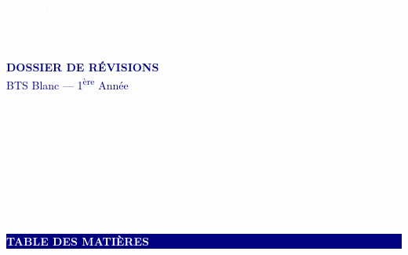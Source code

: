\documentclass[a4paper,10pt]{article}
\begin{document}
\begin{titlepage}
  \pagecolor{navy}
  \begin{center}
    \vspace*{3cm}

    {\Huge\bfseries\textcolor{white}{BTS SIO}}\\[0.5cm]
    {\LARGE\textcolor{white}{Brevet de Technicien Supérieur}}\\
    {\LARGE\textcolor{white}{Services Informatiques aux Organisations}}\\[2cm]

    \begin{tcolorbox}[colback=white, colframe=white, arc=5mm, width=0.8\textwidth]
      \centering
      {\huge\bfseries\textcolor{navy}{DOSSIER DE RÉVISIONS}}\\[0.3cm]
      {\Large\textcolor{navy}{BTS Blanc — 1\textsuperscript{ère} Année}}
    \end{tcolorbox}

    \vspace{2cm}

    {\LARGE\textcolor{white}{Maël Mignard}}\\[0.5cm]
    {\large\textcolor{white}{\today}}

    \vspace{3cm}

    \begin{tcolorbox}[colback=navy!80!black, colframe=white, arc=3mm, width=0.9\textwidth, boxrule=0.5mm]
      \centering\textcolor{white}{\textbf{Matières couvertes :}}\\[0.3cm]
      \textcolor{white}{
        Réseaux \& Routage \quad|\quad
        Administration Linux \& Serveur \\[0.2cm]
        Cybersécurité \quad|\quad
        Programmation (Algo, C\#, Python) \\[0.2cm]
        Création Web \quad|\quad
        Gestion du SI (GLPI, Incidents) \\[0.2cm]
        Mathématiques \quad|\quad
        CEJM \quad|\quad
        Culture G \& Anglais
      }
    \end{tcolorbox}

  \end{center}
\end{titlepage}
\nopagecolor

\newpage
\begin{center}
  \colorbox{navy}{\parbox{\dimexpr\textwidth-2\fboxsep}{
    \centering\vspace{4pt}
    {\LARGE\bfseries\textcolor{white}{TABLE DES MATIÈRES}}
    \vspace{4pt}
  }}
\end{center}
\vspace{1cm}
\end{document}
